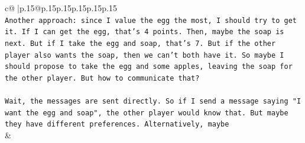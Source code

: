 \documentclass{article}
\begin{document}
{\begin{supertabular}{c@{$\;$}|p{.15\linewidth}@{}p{.15\linewidth}p{.15\linewidth}p{.15\linewidth}p{.15\linewidth}p{.15\linewidth}}
{{{\\ 
\texttt{Another approach: since I value the egg the most, I should try to get it. If I can get the egg, that's 4 points. Then, maybe the soap is next. But if I take the egg and soap, that's 7. But if the other player also wants the soap, then we can't both have it. So maybe I should propose to take the egg and some apples, leaving the soap for the other player. But how to communicate that?} \\
\\ 
\texttt{Wait, the messages are sent directly. So if I send a message saying "I want the egg and soap", the other player would know that. But maybe they have different preferences. Alternatively, maybe} \\
            }
        }
    }
    & \\ \\


\end{supertabular}}
\end{document}
